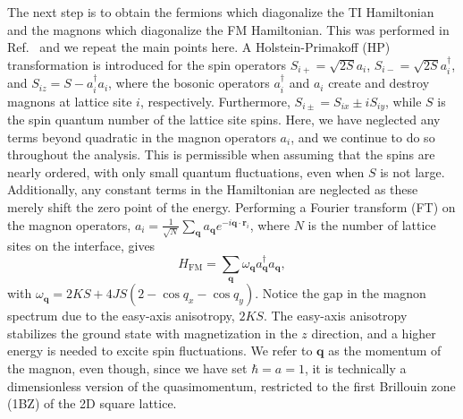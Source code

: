 \documentclass[aps, prb, twocolumn,amsmath,amssymb,floatfix]{revtex4-2}
\begin{document}
The next step is to obtain the fermions which diagonalize the TI Hamiltonian and the magnons which diagonalize the FM Hamiltonian. This was performed in Ref.~\cite{EirikTIFMAFM} and we repeat the main points here. A Holstein-Primakoff (HP) transformation  \cite{HP-PhysRev.58.1098} is introduced for the spin operators $S_{i+} = \sqrt{2S}a_i$, $S_{i-} = \sqrt{2S}a_i^\dagger$, and $S_{iz} = S - a_i^\dagger a_i$, where the bosonic operators $a_i^\dagger$ and $a_i$ create and destroy magnons at lattice site $i$, respectively. 
Furthermore, $S_{i\pm} = S_{ix} \pm i S_{iy}$, while $S$ is the spin quantum number of the lattice site spins. %
Here, we have neglected any terms beyond quadratic in the magnon operators $a_i$, and we continue to do so throughout the analysis. This is permissible when assuming that the spins are nearly ordered, with only small quantum fluctuations, even when $S$ is not large. Additionally, any constant terms in the Hamiltonian are neglected as these merely shift the zero point of the energy. Performing a Fourier transform (FT) on the magnon operators, $a_i = \frac{1}{\sqrt{N}}\sum_{\boldsymbol{q}}a_{\boldsymbol{q}}e^{-i\boldsymbol{q}\cdot \boldsymbol{r}_i}$, where $N$ is the number of lattice sites on the interface, gives
\begin{equation}
    H_{\textrm{FM}} = \sum_{\boldsymbol{q}} \omega_{\boldsymbol{q}} a_{\boldsymbol{q}}^\dagger a_{\boldsymbol{q}},
\end{equation}
with $\omega_{\boldsymbol{q}} = 2KS + 4JS(2-\cos q_x - \cos q_y)$. Notice the gap in the magnon spectrum due to the easy-axis anisotropy, $2KS$. The easy-axis anisotropy stabilizes the ground state with magnetization in the $z$ direction, and a higher energy is needed to excite spin fluctuations. We refer to $\boldsymbol{q}$ as the momentum of the magnon, even though, since we have set $\hbar = a = 1$, it is technically a dimensionless version of the quasimomentum, restricted to the first Brillouin zone (1BZ) of the 2D square lattice.
\end{document}
